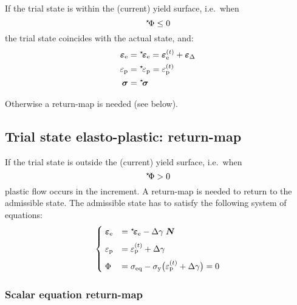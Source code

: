 \documentclass[times]{goose-article}
\newcommand\leftstar[1]{\hspace*{-.3em}~^\star\!#1}
\begin{document}
If the trial state is within the (current) yield surface, i.e.\ when
\begin{equation}
  \leftstar{\Phi} \leq 0
\end{equation}
the trial state coincides with the actual state, and:
\begin{align}
  \bm{\varepsilon}_\mathrm{e}
  &= \leftstar{\bm{\varepsilon}}_\mathrm{e}
   = \bm{\varepsilon}_\mathrm{e}^{(t)} + \bm{\varepsilon}_\Delta
  \\
  \varepsilon_\mathrm{p}
  &= \leftstar{\varepsilon}_\mathrm{p}
   = \varepsilon_\mathrm{p}^{(t)}
  \\
  \bm{\sigma}
  &= \leftstar{\bm{\sigma}}
\end{align}

Otherwise a return-map is needed (see below).

\subsection{Trial state elasto-plastic: return-map}

If the trial state is outside the (current) yield surface, i.e.\ when
\begin{equation}
  \leftstar{\Phi} > 0
\end{equation}
plastic flow occurs in the increment. A return-map is needed to return to the admissible state. The admissible state has to satisfy the following system of equations:
\begin{equation}
\begin{cases}
  \; \bm{\varepsilon}_\mathrm{e}
    &= \leftstar\bm{\varepsilon}_\mathrm{e}
     - \Delta \gamma \; \bm{N}
  \\[2mm]
  \; \varepsilon_\mathrm{p}
    &= \varepsilon_\mathrm{p}^{(t)} + \Delta \gamma
  \\[2mm]
  \; \Phi
    &= \sigma_\mathrm{eq}
     - \sigma_\mathrm{y} \big( \varepsilon_\mathrm{p}^{(t)} + \Delta\gamma \big)
     = 0
\end{cases}
\end{equation}

\subsubsection{Scalar equation return-map}
\end{document}
